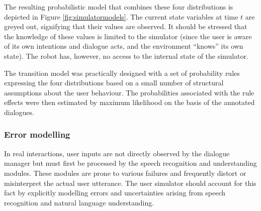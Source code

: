 The resulting probabilistic model that combines these four distributions is depicted in Figure \ref{fig:simulatormodels}. The current state variables at time $t$ are greyed out, signifying that their values are observed.  It should be stressed that the knowledge of these values is limited to the simulator (since the user is aware of its own intentions and dialogue acts, and the environment ``knows'' its own state). The robot has, however, no access to the internal state of the simulator. 

The transition model was practically designed with a set of probability rules expressing the four distributions based on a small number of structural assumptions about the user behaviour.  The probabilities associated with the rule effects were then estimated by maximum likelihood on the basis of the annotated dialogues. 

\subsubsection*{Error modelling}

In real interactions, user inputs are not directly observed by the dialogue manager but must first be processed by the speech recognition and understanding modules.  These modules are prone to various failures and frequently distort or misinterpret the actual user utterance. The user simulator should account for this fact by explicitly modelling errors and uncertainties arising from speech recognition and natural language understanding. 

